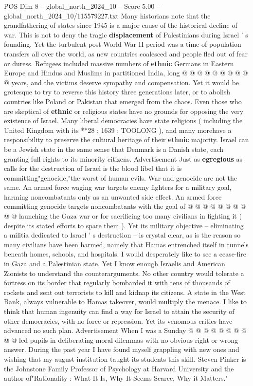 \begin{textsample}{POS Dim 8 – global\_north\_2024\_10 – Score 5.00 – global\_north\_2024\_10/115579227.txt}
Many historians note that the grandfathering of states since 1945 is a major cause of the historical decline of war.
This is not to deny the tragic \textbf{displacement} of Palestinians during Israel ' s founding.
Yet the turbulent post-World War II period was a time of population transfers all over the world, as new countries coalesced and people fled out of fear or duress.
Refugees included massive numbers of \textbf{ethnic} Germans in Eastern Europe and Hindus and Muslims in partitioned India, long @ @ @ @ @ @ @ @ @ @ years, and the victims deserve sympathy and compensation.
Yet it would be grotesque to try to reverse this history three generations later, or to abolish countries like Poland or Pakistan that emerged from the chaos.
Even those who are skeptical of \textbf{ethnic} or religious states have no grounds for opposing the very existence of Israel.
Many liberal democracies have state religions ( including the United Kingdom with its **28 ; 1639 ; TOOLONG ), and many morehave a responsibility to preserve the cultural heritage of their \textbf{ethnic} majority.
Israel can be a Jewish state in the same sense that Denmark is a Danish state, each granting full rights to its minority citizens.
Advertisement Just as \textbf{egregious} as calls for the destruction of Israel is the blood libel that it is committing"genocide,"the worst of human evils.
War and genocide are not the same.
An armed force waging war targets enemy fighters for a military goal, harming noncombatants only as an unwanted side effect.
An armed force committing genocide targets noncombatants with the goal of @ @ @ @ @ @ @ @ @ @ launching the Gaza war or for sacrificing too many civilians in fighting it ( despite its stated efforts to spare them ).
Yet its military objective -- eliminating a militia dedicated to Israel ' s destruction -- is crystal clear, as is the reason so many civilians have been harmed, namely that Hamas entrenched itself in tunnels beneath homes, schools, and hospitals.
I would desperately like to see a cease-fire in Gaza and a Palestinian state.
Yet I know enough Israelis and American Zionists to understand the counterarguments.
No other country would tolerate a fortress on its border that regularly bombarded it with tens of thousands of rockets and sent out terrorists to kill and kidnap its citizens.
A state in the West Bank, always vulnerable to Hamas takeover, would multiply the menace.
I like to think that human ingenuity can find a way for Israel to attain the security of other democracies, with no force or repression.
Yet its venomous critics have advanced no such plan.
Advertisement When I was a Sunday @ @ @ @ @ @ @ @ @ @ led pupils in deliberating moral dilemmas with no obvious right or wrong answer.
During the past year I have found myself grappling with new ones and wishing that my august institution taught its students this skill.
Steven Pinker is the Johnstone Family Professor of Psychology at Harvard University and the author of"Rationality : What It Is, Why It Seems Scarce, Why it Matters."

\end{textsample}
